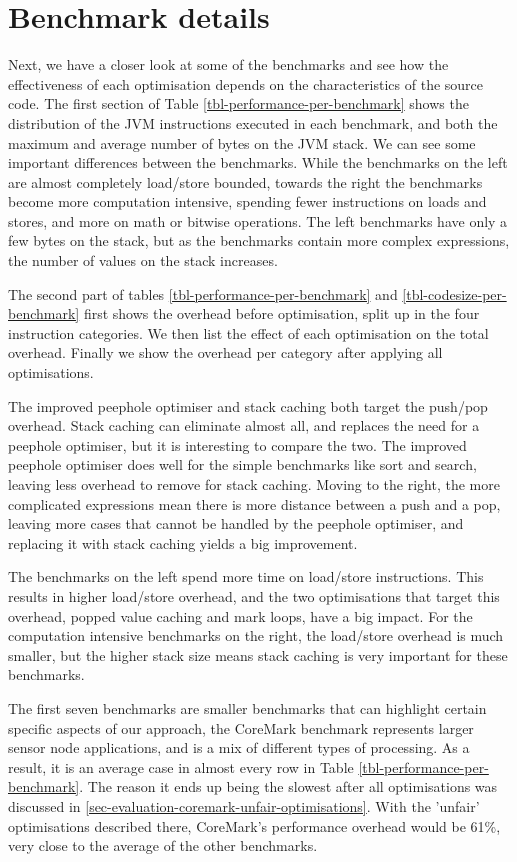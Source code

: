 \section{Benchmark details}
Next, we have a closer look at some of the benchmarks and see how the effectiveness of each optimisation depends on the characteristics of the source code. The first section of Table \ref{tbl-performance-per-benchmark} shows the distribution of the JVM instructions executed in each benchmark, and both the maximum and average number of bytes on the JVM stack. We can see some important differences between the benchmarks. While the benchmarks on the left are almost completely load/store bounded, towards the right the benchmarks become more computation intensive, spending fewer instructions on loads and stores, and more on math or bitwise operations. The left benchmarks have only a few bytes on the stack, but as the benchmarks contain more complex expressions, the number of values on the stack increases.

The second part of tables \ref{tbl-performance-per-benchmark} and \ref{tbl-codesize-per-benchmark} first shows the overhead before optimisation, split up in the four instruction categories. We then list the effect of each optimisation on the total overhead. Finally we show the overhead per category after applying all optimisations.

The improved peephole optimiser and stack caching both target the push/pop overhead. Stack caching can eliminate almost all, and replaces the need for a peephole optimiser, but it is interesting to compare the two. The improved peephole optimiser does well for the simple benchmarks like sort and search, leaving less overhead to remove for stack caching. Moving to the right, the more complicated expressions mean there is more distance between a push and a pop, leaving more cases that cannot be handled by the peephole optimiser, and replacing it with stack caching yields a big improvement.

The benchmarks on the left spend more time on load/store instructions. This results in higher load/store overhead, and the two optimisations that target this overhead, popped value caching and mark loops, have a big impact. For the computation intensive benchmarks on the right, the load/store overhead is much smaller, but the higher stack size means stack caching is very important for these benchmarks.

The first seven benchmarks are smaller benchmarks that can highlight certain specific aspects of our approach, the CoreMark benchmark represents larger sensor node applications, and is a mix of different types of processing. As a result, it is an average case in almost every row in Table \ref{tbl-performance-per-benchmark}. The reason it ends up being the slowest after all optimisations was discussed in \ref{sec-evaluation-coremark-unfair-optimisations}. With the 'unfair' optimisations described there, CoreMark's performance overhead would be 61\%, very close to the average of the other benchmarks.

